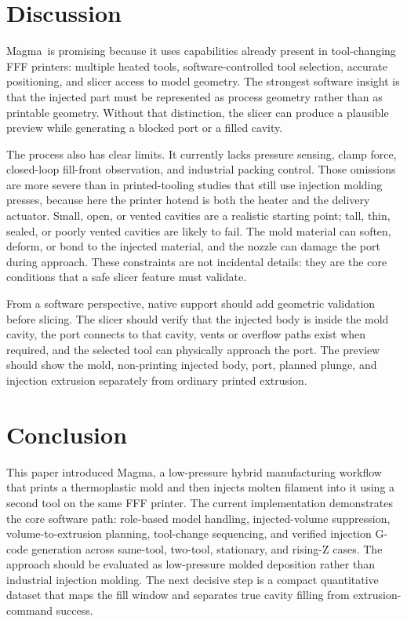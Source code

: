 \documentclass[conference]{IEEEtran}
\newcommand{\magma}{Magma}
\begin{document}
\section{Discussion}
\magma\ is promising because it uses capabilities already present in tool-changing FFF printers: multiple heated tools, software-controlled tool selection, accurate positioning, and slicer access to model geometry. The strongest software insight is that the injected part must be represented as process geometry rather than as printable geometry. Without that distinction, the slicer can produce a plausible preview while generating a blocked port or a filled cavity.

The process also has clear limits. It currently lacks pressure sensing, clamp force, closed-loop fill-front observation, and industrial packing control. Those omissions are more severe than in printed-tooling studies that still use injection molding presses, because here the printer hotend is both the heater and the delivery actuator. Small, open, or vented cavities are a realistic starting point; tall, thin, sealed, or poorly vented cavities are likely to fail. The mold material can soften, deform, or bond to the injected material, and the nozzle can damage the port during approach. These constraints are not incidental details: they are the core conditions that a safe slicer feature must validate.

From a software perspective, native support should add geometric validation before slicing. The slicer should verify that the injected body is inside the mold cavity, the port connects to that cavity, vents or overflow paths exist when required, and the selected tool can physically approach the port. The preview should show the mold, non-printing injected body, port, planned plunge, and injection extrusion separately from ordinary printed extrusion.

\section{Conclusion}
This paper introduced \magma, a low-pressure hybrid manufacturing workflow that prints a thermoplastic mold and then injects molten filament into it using a second tool on the same FFF printer. The current implementation demonstrates the core software path: role-based model handling, injected-volume suppression, volume-to-extrusion planning, tool-change sequencing, and verified injection G-code generation across same-tool, two-tool, stationary, and rising-Z cases. The approach should be evaluated as low-pressure molded deposition rather than industrial injection molding. The next decisive step is a compact quantitative dataset that maps the fill window and separates true cavity filling from extrusion-command success.
\end{document}
